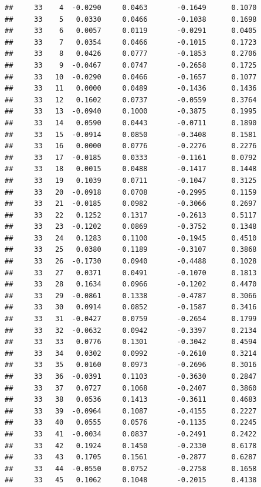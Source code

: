 \documentclass[
]{article}
\begin{document}
\begin{verbatim}
##     33    4  -0.0290     0.0463       -0.1649      0.1070  
##     33    5   0.0330     0.0466       -0.1038      0.1698  
##     33    6   0.0057     0.0119       -0.0291      0.0405  
##     33    7   0.0354     0.0466       -0.1015      0.1723  
##     33    8   0.0426     0.0777       -0.1853      0.2706  
##     33    9  -0.0467     0.0747       -0.2658      0.1725  
##     33   10  -0.0290     0.0466       -0.1657      0.1077  
##     33   11   0.0000     0.0489       -0.1436      0.1436  
##     33   12   0.1602     0.0737       -0.0559      0.3764  
##     33   13  -0.0940     0.1000       -0.3875      0.1995  
##     33   14   0.0590     0.0443       -0.0711      0.1890  
##     33   15  -0.0914     0.0850       -0.3408      0.1581  
##     33   16   0.0000     0.0776       -0.2276      0.2276  
##     33   17  -0.0185     0.0333       -0.1161      0.0792  
##     33   18   0.0015     0.0488       -0.1417      0.1448  
##     33   19   0.1039     0.0711       -0.1047      0.3125  
##     33   20  -0.0918     0.0708       -0.2995      0.1159  
##     33   21  -0.0185     0.0982       -0.3066      0.2697  
##     33   22   0.1252     0.1317       -0.2613      0.5117  
##     33   23  -0.1202     0.0869       -0.3752      0.1348  
##     33   24   0.1283     0.1100       -0.1945      0.4510  
##     33   25   0.0380     0.1189       -0.3107      0.3868  
##     33   26  -0.1730     0.0940       -0.4488      0.1028  
##     33   27   0.0371     0.0491       -0.1070      0.1813  
##     33   28   0.1634     0.0966       -0.1202      0.4470  
##     33   29  -0.0861     0.1338       -0.4787      0.3066  
##     33   30   0.0914     0.0852       -0.1587      0.3416  
##     33   31  -0.0427     0.0759       -0.2654      0.1799  
##     33   32  -0.0632     0.0942       -0.3397      0.2134  
##     33   33   0.0776     0.1301       -0.3042      0.4594  
##     33   34   0.0302     0.0992       -0.2610      0.3214  
##     33   35   0.0160     0.0973       -0.2696      0.3016  
##     33   36  -0.0391     0.1103       -0.3630      0.2847  
##     33   37   0.0727     0.1068       -0.2407      0.3860  
##     33   38   0.0536     0.1413       -0.3611      0.4683  
##     33   39  -0.0964     0.1087       -0.4155      0.2227  
##     33   40   0.0555     0.0576       -0.1135      0.2245  
##     33   41  -0.0034     0.0837       -0.2491      0.2422  
##     33   42   0.1924     0.1450       -0.2330      0.6178  
##     33   43   0.1705     0.1561       -0.2877      0.6287  
##     33   44  -0.0550     0.0752       -0.2758      0.1658  
##     33   45   0.1062     0.1048       -0.2015      0.4138  

\end{verbatim}
\end{document}
